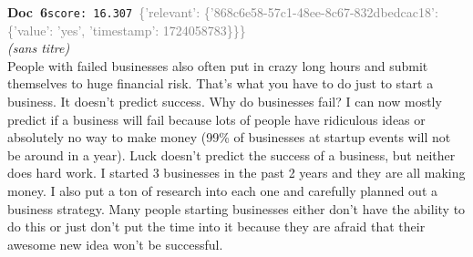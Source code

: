 \documentclass[a4paper,11pt]{article}
\begin{document}
\begin{docenv}
{\footnotesize\textcolor{doccolor}{\textbf{Doc~6}}}\hfill{\tiny\texttt{score:~16.307}}\ {\tiny\textcolor{gray}{\{'relevant': \{'868c6e58-57c1-48ee-8c67-832dbedcac18': \{'value': 'yes', 'timestamp': 1724058783\}\}\}}}\\[3pt]
{\small\textit{(sans titre)}}\\[2pt]
\vspace{2pt}
{\footnotesize 
People with failed businesses also often put in crazy long hours and submit themselves to huge financial risk. That's what you have to do just to start a business. It doesn't predict success.  Why do businesses fail?  I can now mostly predict if a business will fail because lots of people have ridiculous ideas or absolutely no way to make money (99\% of businesses at startup events will not be around in a year).  Luck doesn't predict the success of a business, but neither does hard work.  I started 3 businesses in the past 2 years and they are all making money.  I also put a ton of research into each one and carefully planned out a business strategy.    Many people starting businesses either don't have the ability to do this or just don't put the time into it because they are afraid that their awesome new idea won't be successful.}
\end{docenv}
\end{document}
